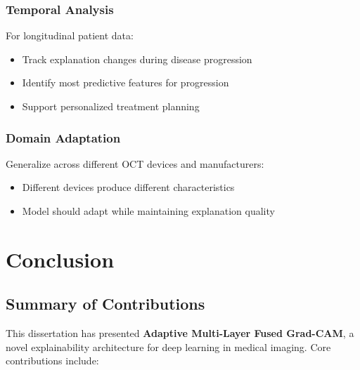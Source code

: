 \documentclass[12pt,a4paper,oneside]{book}
\begin{document}
\subsection{Temporal Analysis}

For longitudinal patient data:
\begin{itemize}
  \item Track explanation changes during disease progression
  \item Identify most predictive features for progression
  \item Support personalized treatment planning
\end{itemize}

\subsection{Domain Adaptation}

Generalize across different OCT devices and manufacturers:
\begin{itemize}
  \item Different devices produce different characteristics
  \item Model should adapt while maintaining explanation quality
\end{itemize}

\chapter{Conclusion}
\label{ch:conclusion}

\section{Summary of Contributions}

This dissertation has presented \textbf{Adaptive Multi-Layer Fused Grad-CAM}, a novel explainability architecture for deep learning in medical imaging. Core contributions include:
\end{document}
